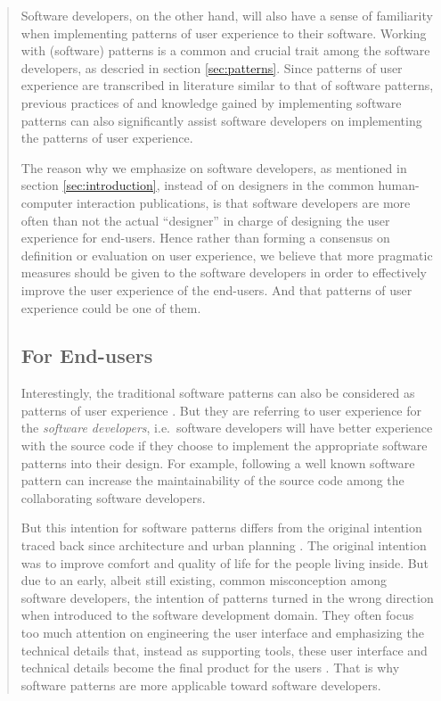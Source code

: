 \documentclass[a4paper,titlepage]{article}
\begin{document}
\begin{quote}
Software developers, on the other hand, will also have a sense of
familiarity when implementing patterns of user experience to their
software. Working with (software) patterns is a common and crucial
trait among the software developers, as descried in section
\ref{sec:patterns}. Since patterns of user experience are transcribed
in literature similar to that of software patterns, previous practices
of and knowledge gained by implementing software patterns can also
significantly assist software developers on implementing the patterns
of user experience.

The reason why we emphasize on software developers, as mentioned in
section \ref{sec:introduction}, instead of on designers in the common
human-computer interaction publications, is that software developers
are more often than not the actual ``designer'' in charge of designing
the user experience for end-users. Hence rather than forming a
consensus on definition or evaluation on user experience, we believe
that more pragmatic measures should be given to the software
developers in order to effectively improve the user experience of the
end-users. And that patterns of user experience could be one of them.

\subsection{For End-users}
Interestingly, the traditional software patterns can also be
considered as patterns of user experience \citep{pux:blackwell}. But
they are referring to user experience for the \textit{software
  developers}, i.e.\ software developers will have better experience
with the source code if they choose to implement the appropriate
software patterns into their design. For example, following a well
known software pattern can increase the maintainability of the source
code among the collaborating software developers.

But this intention for software patterns differs from the original
intention traced back since architecture and urban planning
\citep{timeless:alexander}. The original intention was to improve
comfort and quality of life for the people living inside. But due to
an early, albeit still existing, common misconception among software
developers, the intention of patterns turned in the wrong direction
when introduced to the software development domain. They often focus
too much attention on engineering the user interface and emphasizing
the technical details that, instead as supporting tools, these user
interface and technical details become the final product for the users
\citep{pux:blackwell}. That is why software patterns are more
applicable toward software developers.


\end{quote}
\end{document}
